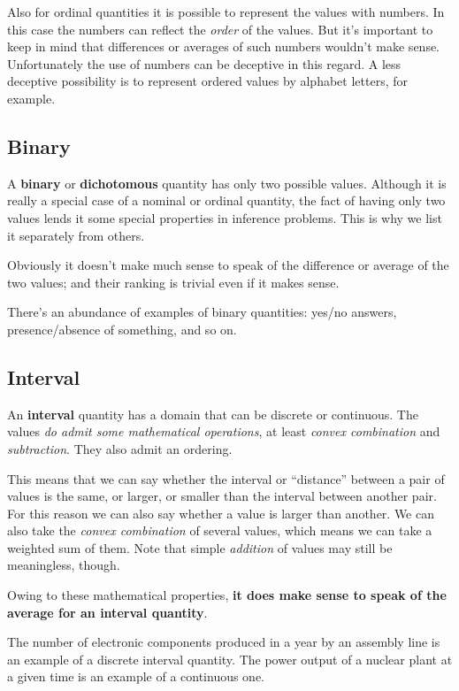 \documentclass[
  a4paper,
  DIV=11,
  numbers=noendperiod,
  oneside]{scrreprt}
\begin{document}
Also for ordinal quantities it is possible to represent the values with
numbers. In this case the numbers can reflect the \emph{order} of the
values. But it's important to keep in mind that differences or averages
of such numbers wouldn't make sense. Unfortunately the use of numbers
can be deceptive in this regard. A less deceptive possibility is to
represent ordered values by alphabet letters, for example.

\hypertarget{binary}{%
\subsection{Binary}\label{binary}}

A {\textbf{binary}} or {\textbf{dichotomous}} quantity has only two
possible values. Although it is really a special case of a nominal or
ordinal quantity, the fact of having only two values lends it some
special properties in inference problems. This is why we list it
separately from others.

Obviously it doesn't make much sense to speak of the difference or
average of the two values; and their ranking is trivial even if it makes
sense.

There's an abundance of examples of binary quantities: yes/no answers,
presence/absence of something, and so on.

\hypertarget{interval}{%
\subsection{Interval}\label{interval}}

An {\textbf{interval}} quantity has a domain that can be discrete or
continuous. The values {\emph{do admit some mathematical operations}},
at least \emph{convex combination} and \emph{subtraction}. They also
admit an ordering.

This means that we can say whether the interval or ``distance'' between
a pair of values is the same, or larger, or smaller than the interval
between another pair. For this reason we can also say whether a value is
larger than another. We can also take the \emph{convex combination} of
several values, which means we can take a weighted sum of them. Note
that simple \emph{addition} of values may still be meaningless, though.

Owing to these mathematical properties, {\textbf{it does make sense to
speak of the average for an interval quantity}}.

The number of electronic components produced in a year by an assembly
line is an example of a discrete interval quantity. The power output of
a nuclear plant at a given time is an example of a continuous one.
\end{document}
